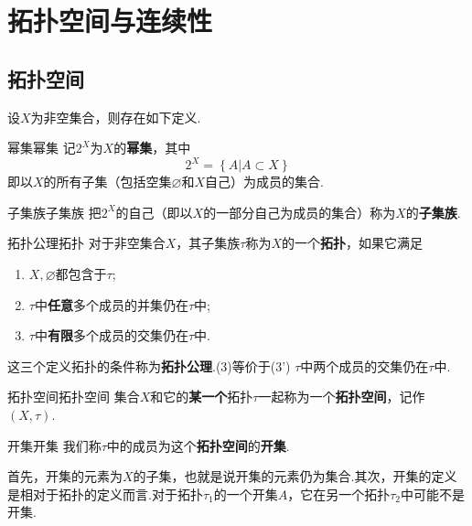 \documentclass{ctexart}
\begin{document}
\section{拓扑空间与连续性}
\subsection{拓扑空间}
设$X$为非空集合，则存在如下定义.
\begin{定义}{幂集}{幂集}
	记$2^X$为$X$的\textbf{幂集}，其中
	$$
	2^X = \left\lbrace A | A \subset X \right\rbrace 
	$$
	即以$X$的所有子集（包括空集$ \varnothing$和$X$自己）为成员的集合.
\end{定义}
\begin{定义}{子集族}{子集族}
	把$2^X$的自己（即以$X$的一部分自己为成员的集合）称为$X$的\textbf{子集族}.
\end{定义}
\begin{定义}{拓扑公理}{拓扑}
	对于非空集合$X$，其子集族$\tau$称为$X$的一个\textbf{拓扑}，如果它满足{
	\begin{enumerate}[label=(\arabic*)]
		\item $X,\varnothing$都包含于$\tau$;
		\item $\tau$中\textbf{任意}多个成员的并集仍在$\tau$中;
		\item $\tau$中\textbf{有限}多个成员的交集仍在$\tau$中.
	\end{enumerate}
	}
	这三个定义拓扑的条件称为\textbf{拓扑公理}.(3)等价于(3')$\,\,\tau$中两个成员的交集仍在$\tau$中.
\end{定义}
\begin{定义}{拓扑空间}{拓扑空间}
	集合$X$和它的\textbf{某一个}拓扑$\tau$一起称为一个\textbf{拓扑空间}，记作$(X,\tau)$.
\end{定义}
\begin{定义}{开集}{开集}
	我们称$\tau$中的成员为这个\textbf{拓扑空间}的\textbf{开集}.
\end{定义}
\begin{注意}
	首先，开集的元素为$X$的子集，也就是说开集的元素仍为集合.其次，开集的定义是相对于拓扑的定义而言.对于拓扑$\tau_1$的一个开集$A$，它在另一个拓扑$\tau_2$中可能不是开集.
\end{注意}
\end{document}
